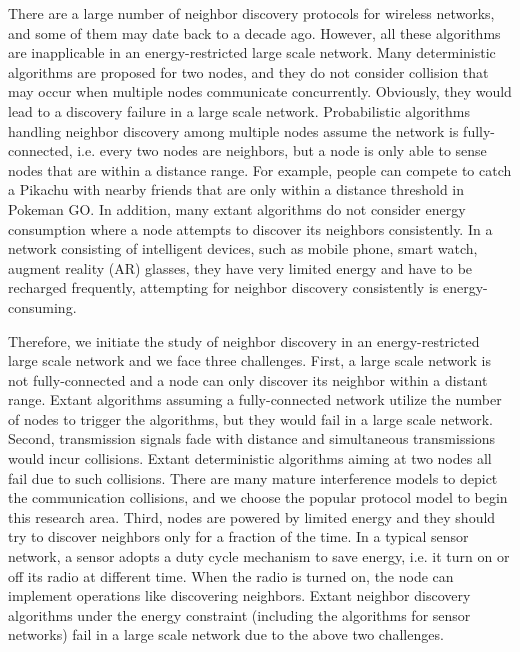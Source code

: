 There are a large number of neighbor discovery protocols for wireless networks, and some of them may date back to a decade ago. 
However, all these algorithms are inapplicable in an energy-restricted large scale network. Many deterministic algorithms are proposed for two nodes\cite{XX,XX}, and they do not consider collision that may occur when multiple nodes communicate concurrently. Obviously, they would lead to a discovery failure in a large scale network. Probabilistic algorithms handling neighbor discovery among multiple nodes\cite{XX,XX} assume the network is fully-connected, i.e. every two nodes are neighbors, but a node is only able to sense nodes that are within a distance range. For example, people can compete to catch a Pikachu with nearby friends that are only within a distance threshold in Pokeman GO. In addition, many extant algorithms do not consider energy consumption where a node attempts to discover its neighbors consistently.
In a network consisting of intelligent devices, such as mobile phone, smart watch, augment reality (AR) glasses, they have very limited energy and have to be recharged frequently, attempting for neighbor discovery consistently is energy-consuming. 

Therefore, we initiate the study of neighbor discovery in an energy-restricted large scale network and we face three challenges. First, a large scale network is not fully-connected and a node can only discover its neighbor within a distant range. Extant algorithms assuming a fully-connected network utilize the number of nodes to trigger the algorithms, but they would fail in a large scale network. Second, transmission signals fade with distance and simultaneous transmissions would incur collisions. Extant deterministic algorithms aiming at two nodes all fail due to such collisions. There are many mature interference models to depict the communication collisions, and we choose the popular protocol model\cite{XX} to begin this research area. Third, nodes are powered by limited energy and they should try to discover neighbors only for a fraction of the time. In a typical sensor network\cite{XX}, a sensor adopts a duty cycle mechanism to save energy, i.e. it turn on or off its radio at different time. When the radio is turned on, the node can implement operations like discovering neighbors. Extant neighbor discovery algorithms under the energy constraint (including the algorithms for sensor networks) fail in a large scale network due to the above two challenges.

